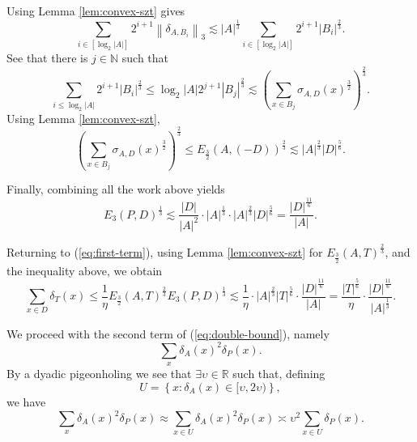 \documentclass[reqno]{amsart}
\numberwithin{equation}{section}
\begin{document}
Using Lemma \ref{lem:convex-szt} gives
\[
    \sum _{i \in [\log _{2} \left\lvert A \right\rvert ]} 2^{i+1} \left\lVert \delta_{A,B_{i} }  \right\rVert _{3} \lesssim \left\lvert A \right\rvert ^{\frac{1}{3} } \sum _{i \in [\log _{2} \left\lvert A \right\rvert ]} 2^{i+1}  \left\lvert B_{i}  \right\rvert ^{\frac{2}{3} }
.\]
See that there is \(j \in \mathbb{N} \) such that
\[
    \sum _{i \leq \log _{2} \left\lvert A \right\rvert } 2^{i+1} \left\lvert B_{i}  \right\rvert ^{\frac{2}{3} } \leq \log _{2} \left\lvert A \right\rvert 2^{j+1} \left\lvert B_{j}  \right\rvert ^{\frac{2}{3} } \lesssim \left( \sum _{x \in B_{j} } \sigma_{A,D} (x)^{\frac{3}{2} } \right) ^{\frac{2}{3} }
.\]
Using Lemma \ref{lem:convex-szt},
\[
    \left( \sum _{x \in B_{j} } \sigma_{A,D}    (x)^{\frac{3}{2} } \right)^{\frac{2}{3} } \leq  E_{\frac{3}{2} } (A,\left( -D \right) )^{\frac{2}{3} } \lesssim \left\lvert A \right\rvert ^{\frac{2}{3} } \left\lvert D \right\rvert ^{\frac{5}{6} }
.\]

Finally, combining all the work above yields
\[
    E_{3} (P,D)^{\frac{1}{3} } \lesssim  \frac{\left\lvert D \right\rvert }{\left\lvert A \right\rvert ^{2}} \cdot \left\lvert A \right\rvert ^{\frac{1}{3} } \cdot \left\lvert A \right\rvert ^{\frac{2}{3} } \left\lvert D \right\rvert ^{\frac{5}{6} } = \frac{\left\lvert D \right\rvert ^{\frac{11}{6} }}{\left\lvert A \right\rvert }
.\]

Returning to (\ref{eq:first-term}), using Lemma \ref{lem:convex-szt} for \(E_{\frac{3}{2} } (A,T)^{\frac{2}{3} }\), and the inequality above, we obtain
\begin{equation} \label{eq:bloom-arg-part-1}
    \sum _{x \in D} \delta_{T} (x) \leq \frac{1}{\eta} E_{\frac{3}{2} } (A,T)^{\frac{2}{3} } E_{3} (P,D)^{\frac{1}{3} } \lesssim \frac{1}{\eta} \cdot  \left\lvert A \right\rvert ^{\frac{2}{3} }\left\lvert T \right\rvert ^{\frac{5}{6} } \cdot \frac{\left\lvert D \right\rvert ^{\frac{11}{6} }}{\left\lvert A \right\rvert }  = \frac{\left\lvert T \right\rvert ^{\frac{5}{6} }}{\eta}    \cdot \frac{\left\lvert D \right\rvert ^{\frac{11}{6} }}{\left\lvert A \right\rvert ^{\frac{1}{3} }} .
\end{equation}

We proceed with the second term of (\ref{eq:double-bound}), namely
\[
    \sum _{x} \delta_{A} (x)^{2}\delta_{P} (x)
.\]
By a dyadic pigeonholing we see that \( \exists \upsilon \in \mathbb{R}     \) such that, defining
\[
    U = \left\{ x : \delta_{A} (x) \in [\upsilon,2\upsilon) \right\}
,\]
we have
\[
    \sum _{x} \delta_{A} (x) ^{2} \delta_{P} (x) \approx \sum _{x \in U} \delta_{A}(x)^{2} \delta_{P} (x) \asymp \upsilon^{2} \sum _{x \in U} \delta_{P} (x) 
.\]
\end{document}
